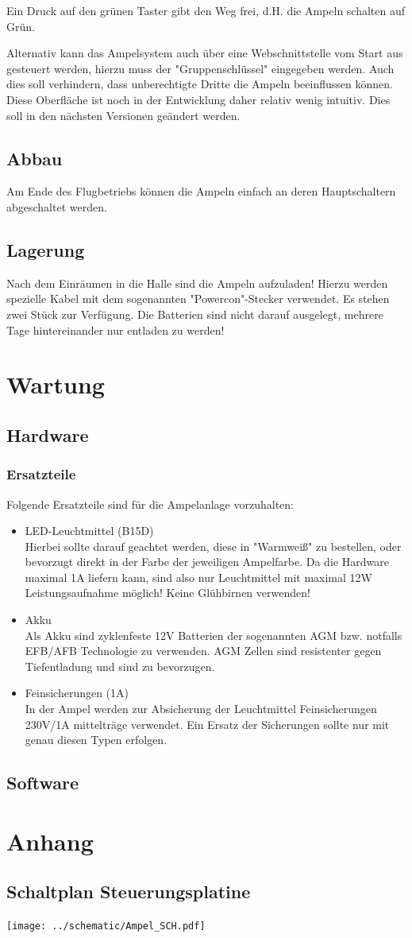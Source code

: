 \documentclass[a4paper, ngerman]{scrartcl}
\begin{document}
Ein Druck auf den grünen Taster gibt den Weg frei, d.H. die Ampeln schalten auf Grün.

Alternativ kann das Ampelsystem auch über eine Webschnittstelle vom Start aus gesteuert werden, hierzu muss der "{}Gruppenschlüssel"{} eingegeben werden. Auch dies soll verhindern, dass unberechtigte Dritte die Ampeln beeinflussen können. Diese Oberfläche ist noch in der Entwicklung daher relativ wenig intuitiv. Dies soll in den nächsten Versionen geändert werden.

\subsection{Abbau}
Am Ende des Flugbetriebs können die Ampeln einfach an deren Hauptschaltern abgeschaltet werden.

\subsection{Lagerung}
Nach dem Einräumen in die Halle sind die Ampeln aufzuladen! Hierzu werden spezielle Kabel mit dem sogenannten "{}Powercon"{}-Stecker verwendet. Es stehen zwei Stück zur Verfügung. Die Batterien sind nicht darauf ausgelegt, mehrere Tage hintereinander nur entladen zu werden!

\section{Wartung}
\subsection{Hardware}
\subsubsection{Ersatzteile}
Folgende Ersatzteile sind für die Ampelanlage vorzuhalten:
\begin{itemize}
 \item LED-Leuchtmittel (B15D)\\
	Hierbei sollte darauf geachtet werden, diese in "{}Warmweiß"{} zu bestellen, oder bevorzugt direkt in der Farbe der jeweiligen Ampelfarbe. Da die Hardware maximal 1A liefern kann, sind also nur Leuchtmittel mit maximal 12W Leistungsaufnahme möglich! Keine Glühbirnen verwenden!
 \item Akku\\
	Als Akku sind zyklenfeste 12V Batterien der sogenannten AGM bzw. notfalls EFB/AFB Technologie zu verwenden. AGM Zellen sind resistenter gegen Tiefentladung und sind zu bevorzugen.
 \item Feinsicherungen (1A)\\
	In der Ampel werden zur Absicherung der Leuchtmittel Feinsicherungen 230V/1A mittelträge verwendet. Ein Ersatz der Sicherungen sollte nur mit genau diesen Typen erfolgen.
\end{itemize}
\subsection{Software}

\section{Anhang}
\subsection{Schaltplan Steuerungsplatine}
\texttt{[image: ../schematic/Ampel\_SCH.pdf]}
\end{document}
